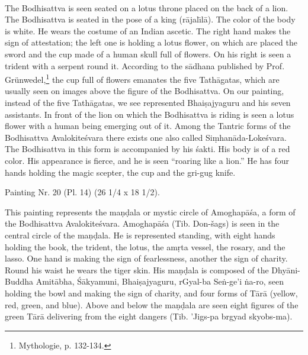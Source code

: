 \documentclass[a4paper, 12pt, oneside]{article}
\begin{document}
\paragraph{}
The Bodhisattva is seen seated on a lotus throne placed on the back of a lion. The Bodhisattva is seated in the pose of a king (r\={a}jal\={\i}l\={a}). The color of the body is white. He wears the costume of an Indian ascetic. The right hand makes the sign of attestation; the left one is holding a lotus flower, on which are placed the sword and the cup made of a human skull full of flowers. On his right is seen a trident with a serpent round it. According to the s\={a}dhana published by Prof. Grünwedel,\footnote{Mythologie, p. 132-134.} the cup full of flowers emanates the five Tath\={a}gatas, which are usually seen on images above the figure of the Bodhisattva. On our painting, instead of the five Tath\={a}gatas, we see represented Bhai\d{s}ajyaguru and his seven assistants. In front of the lion on which the Bodhisattva is riding is seen a lotus flower with a human being emerging out of it. Among the Tantric forms of the Bodhisattva Avalokite\'{s}vara there exists one also called Si\d{m}han\={a}da-Loke\'{s}vara. The Bodhisattva in this form is accompanied by his \'{s}akti. His body is of a red color. His appearance is fierce, and he is seen ``roaring like a lion.'' He has four hands holding the magic scepter, the cup and the gri-gug knife.

\bigskip

Painting Nr. 20 (Pl. 14) (26 1/4 x 18 1/2).

\bigskip

This painting represents the ma\d{n}\d{d}ala or mystic circle of Amoghap\={a}\'{s}a, a form of the Bodhisattva Avalokite\'{s}vara. Amoghap\={a}\'{s}a (Tib. Don-šags) is seen in the central circle of the ma\d{n}\d{d}ala. He is represented standing, with eight hands holding the book, the trident, the lotus, the am\d{r}ta vessel, the rosary, and the lasso. One hand is making the sign of fearlessness, another the sign of charity. Round his waist he wears the tiger skin. His ma\d{n}\d{d}ala is composed of the Dhy\={a}ni-Buddha Amit\={a}bha, \'{S}\={a}kyamuni, Bhai\d{s}ajyaguru, rGyal-ba Se\.{n}-ge'i \.{n}a-ro, seen holding the bowl and making the sign of charity, and four forms of T\={a}r\={a} (yellow, red, green, and blue). Above and below the ma\d{n}\d{d}ala are seen eight figures of the green T\={a}r\={a} delivering from the eight dangers (Tib. 'Jigs-pa brgyad skyobs-ma).

\bigskip
\end{document}
